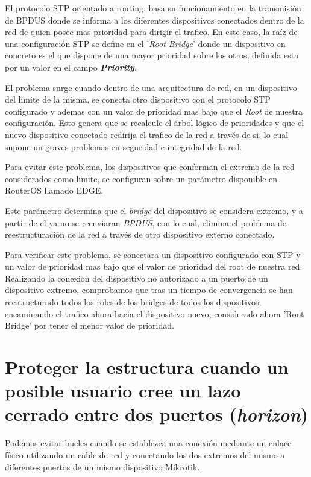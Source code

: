 El protocolo STP orientado a routing, basa su funcionamiento en la transmisión de BPDUS donde se informa a los diferentes dispositivos conectados dentro de la red de quien posee mas prioridad para dirigir el trafico. En este caso, la raíz de una configuración STP se define en el '\textit{Root Bridge}' donde un dispositivo en concreto es el que dispone de una mayor prioridad sobre los otros, definida esta por un valor en el campo \textit{\textbf{Priority}}.

El problema surge cuando dentro de una arquitectura de red, en un dispositivo del limite de la misma, se conecta otro dispositivo con el protocolo STP configurado y ademas con un valor de prioridad mas bajo que el \textit{Root} de nuestra configuración. Esto genera que se recalcule el árbol lógico de prioridades y que el nuevo dispositivo conectado redirija el trafico de la red a través de si, lo cual supone un graves problemas en seguridad e integridad de la red.

Para evitar este problema, los dispositivos que conforman el extremo de la red considerados como limite, se configuran sobre un parámetro disponible en RouterOS llamado EDGE.

Este parámetro determina que el \textit{bridge} del dispositivo se considera extremo, y a partir de el ya no se reenviaran \textit{BPDUS}, con lo cual, elimina el problema de reestructuración de la red a través de otro dispositivo externo conectado.

Para verificar este problema, se conectara un dispositivo configurado con STP y un valor de prioridad mas bajo que el valor de prioridad del root de nuestra red. Realizando la conexion del dispositivo no autorizado a un puerto de un dispositivo extremo, comprobamos que tras un tiempo de convergencia se han reestructurado todos los roles de los bridges de todos los dispositivos, encaminando el trafico ahora hacia el dispositivo nuevo, considerado ahora 'Root Bridge' por tener el menor valor de prioridad.


\section{Proteger la estructura cuando un posible usuario cree un lazo cerrado entre dos puertos (\textit{horizon})}
\label{horizon5}
Podemos evitar bucles cuando se establezca una conexión mediante un enlace físico utilizando un cable de red y conectando los dos extremos del mismo a diferentes puertos de un mismo dispositivo Mikrotik.


